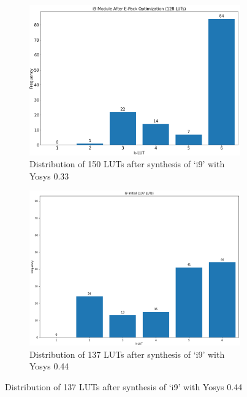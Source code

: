 \begin{figure}
    \begin{subfigure}{0.47\textwidth}
        \centering
        \includegraphics[width=\textwidth]{img/y33.png}
        \caption{Distribution of 150 LUTs after synthesis of `i9' with Yosys 0.33}\label{fig:histogram:y33}
    \end{subfigure}
    \hfill\vspace{4mm}
    \begin{subfigure}{0.47\textwidth}
        \centering
        \includegraphics[width=\textwidth]{img/y44.png}
        \caption{Distribution of 137 LUTs after synthesis of `i9' with Yosys 0.44}\label{fig:histogram:y44}
    \end{subfigure}
    \hfill\vspace{4mm}

\end{figure}
